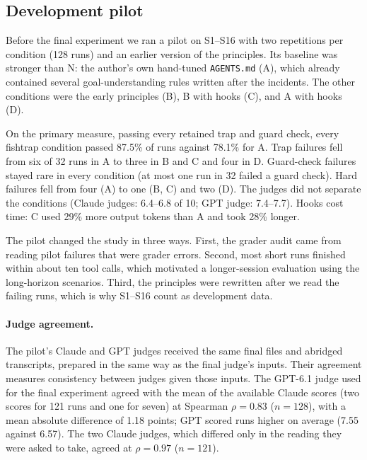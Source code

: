 \subsection{Development pilot}
\label{sec:pilot}

Before the final experiment we ran a pilot on S1--S16 with two repetitions per condition (128 runs) and an earlier version of the principles. Its baseline was stronger than N: the author's own hand-tuned \texttt{AGENTS.md} (A), which already contained several goal-understanding rules written after the incidents. The other conditions were the early principles (B), B with hooks (C), and A with hooks (D).

On the primary measure, passing every retained trap and guard check, every fishtrap condition passed 87.5\% of runs against 78.1\% for A. Trap failures fell from six of 32 runs in A to three in B and C and four in D. Guard-check failures stayed rare in every condition (at most one run in 32 failed a guard check). Hard failures fell from four (A) to one (B, C) and two (D). The judges did not separate the conditions (Claude judges: 6.4--6.8 of 10; GPT judge: 7.4--7.7). Hooks cost time: C used 29\% more output tokens than A and took 28\% longer.

The pilot changed the study in three ways. First, the grader audit came from reading pilot failures that were grader errors. Second, most short runs finished within about ten tool calls, which motivated a longer-session evaluation using the long-horizon scenarios. Third, the principles were rewritten after we read the failing runs, which is why S1--S16 count as development data.

\paragraph{Judge agreement.} The pilot's Claude and GPT judges received the same final files and abridged transcripts, prepared in the same way as the final judge's inputs. Their agreement measures consistency between judges given those inputs. The GPT-6.1 judge used for the final experiment agreed with the mean of the available Claude scores (two scores for 121 runs and one for seven) at Spearman $\rho = 0.83$ ($n = 128$), with a mean absolute difference of 1.18 points; GPT scored runs higher on average (7.55 against 6.57). The two Claude judges, which differed only in the reading they were asked to take, agreed at $\rho = 0.97$ ($n = 121$).
